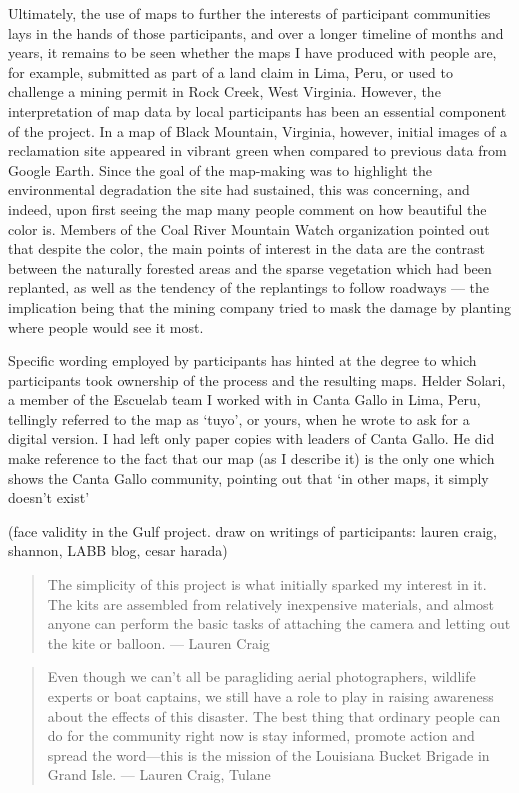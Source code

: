 \documentclass[11pt,oneside,notitlepage]{report}
\begin{document}
Ultimately, the use of maps to further the interests of participant communities lays in the hands of those participants, and over a longer timeline of months and years, it remains to be seen whether the maps I have produced with people are, for example, submitted as part of a land claim in Lima, Peru, or used to challenge a mining permit in Rock Creek, West Virginia. However, the interpretation of map data by local participants has been an essential component of the project. In a map of Black Mountain, Virginia, however, initial images of a reclamation site appeared in vibrant green when compared to previous data from Google Earth. Since the goal of the map-making was to highlight the environmental degradation the site had sustained, this was concerning, and indeed, upon first seeing the map many people comment on how beautiful the color is. Members of the Coal River Mountain Watch organization pointed out that despite the color, the main points of interest in the data are the contrast between the naturally forested areas and the sparse vegetation which had been replanted, as well as the tendency of the replantings to follow roadways --- the implication being that the mining company tried to mask the damage by planting where people would see it most.  

Specific wording employed by participants has hinted at the degree to which participants took ownership of the process and the resulting maps. Helder Solari, a member of the Escuelab team I worked with in Canta Gallo in Lima, Peru, tellingly referred to the map as `tuyo', or yours, when he wrote to ask for a digital version. I had left only paper copies with leaders of Canta Gallo. He did make reference to the fact that our map (as I describe it) is the only one which shows the Canta Gallo community, pointing out that `in other maps, it simply doesn't exist' \cite{solari2010cantagallo}

(face validity in the Gulf project. draw on writings of participants: lauren craig, shannon, LABB blog, cesar harada)

\begin{quote}
The simplicity of this project is what initially sparked my interest in it. The kits are assembled from relatively inexpensive materials, and almost anyone can perform the basic tasks of attaching the camera and letting out the kite or balloon. --- Lauren Craig
\end{quote}

\begin{quote}
Even though we can’t all be paragliding aerial photographers, wildlife experts or boat captains, we still have a role to play in raising awareness about the effects of this disaster. The best thing that ordinary people can do for the community right now is stay informed, promote action and spread the word—this is the mission of the Louisiana Bucket Brigade in Grand Isle.
--- Lauren Craig, Tulane
\end{quote}
\end{document}
